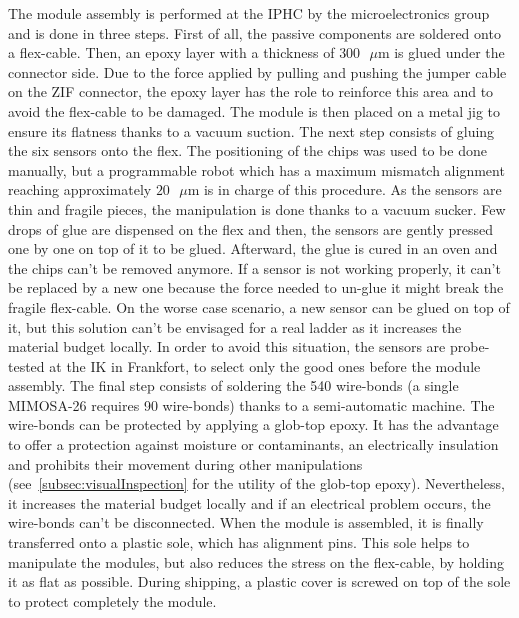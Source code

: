     The module assembly is performed at the IPHC by the microelectronics group and is done in three steps.
    First of all, the passive components are soldered onto a flex-cable.
    Then, an epoxy layer with a thickness of $300 \text{ }\mu\text{m}$ is glued under the connector side.
    Due to the force applied by pulling and pushing the jumper cable on the ZIF connector, the epoxy layer has the role to reinforce this area and to avoid the flex-cable to be damaged.
    The module is then placed on a metal jig to ensure its flatness thanks to a vacuum suction.
    The next step consists of gluing the six sensors onto the flex.
    The positioning of the chips was used to be done manually, but a programmable robot which has a maximum mismatch alignment reaching approximately $20 \text{ }\mu\text{m}$ is in charge of this procedure.
    As the sensors are thin and fragile pieces, the manipulation is done thanks to a vacuum sucker.
    Few drops of glue are dispensed on the flex and then, the sensors are gently pressed one by one on top of it to be glued.
    Afterward, the glue is cured in an oven and the chips can't be removed anymore.
    If a sensor is not working properly, it can't be replaced by a new one because the force needed to un-glue it might break the fragile flex-cable.
    On the worse case scenario, a new sensor can be glued on top of it, but this solution can't be envisaged for a real ladder as it increases the material budget locally.
    In order to avoid this situation, the sensors are probe-tested at the IK in Frankfort, to select only the good ones before the module assembly.
    The final step consists of soldering the 540 wire-bonds (a single MIMOSA-26 requires 90 wire-bonds) thanks to a semi-automatic machine.
    The wire-bonds can be protected by applying a glob-top epoxy.
    It has the advantage to offer a protection against moisture or contaminants, an electrically insulation and prohibits their movement during other manipulations (see~\ref{subsec:visualInspection} for the utility of the glob-top epoxy). 
    Nevertheless, it increases the material budget locally and if an electrical problem occurs, the wire-bonds can't be disconnected.
    When the module is assembled, it is finally transferred onto a plastic sole, which has alignment pins.
    This sole helps to manipulate the modules, but also reduces the stress on the flex-cable, by holding it as flat as possible.
    During shipping, a plastic cover is screwed on top of the sole to protect completely the module.

